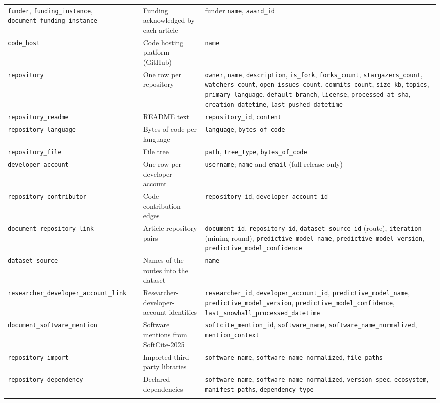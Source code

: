 \documentclass[pdflatex,sn-nature]{sn-jnl}%
\begin{document}
\begin{table}[p]
\begin{tabular}{@{}>{\raggedright\arraybackslash}p{94pt}>{\raggedright\arraybackslash}p{92pt}>{\raggedright\arraybackslash}p{170pt}@{}}
\texttt{funder}, \texttt{funding\_instance}, \texttt{document\_funding\_instance} & Funding acknowledged by each article & funder \texttt{name}, \texttt{award\_id} \\
\texttt{code\_host} & Code hosting platform (GitHub) & \texttt{name} \\
\texttt{repository} & One row per repository & \texttt{owner}, \texttt{name}, \texttt{description}, \texttt{is\_fork}, \texttt{forks\_count}, \texttt{stargazers\_count}, \texttt{watchers\_count}, \texttt{open\_issues\_count}, \texttt{commits\_count}, \texttt{size\_kb}, \texttt{topics}, \texttt{primary\_language}, \texttt{default\_branch}, \texttt{license}, \texttt{processed\_at\_sha}, \texttt{creation\_datetime}, \texttt{last\_pushed\_datetime} \\
\texttt{repository\_readme} & README text & \texttt{repository\_id}, \texttt{content} \\
\texttt{repository\_language} & Bytes of code per language & \texttt{language}, \texttt{bytes\_of\_code} \\
\texttt{repository\_file} & File tree & \texttt{path}, \texttt{tree\_type}, \texttt{bytes\_of\_code} \\
\texttt{developer\_account} & One row per developer account & \texttt{username}; \texttt{name} and \texttt{email} (full release only) \\
\texttt{repository\_contributor} & Code contribution edges & \texttt{repository\_id}, \texttt{developer\_account\_id} \\
\texttt{document\_repository\_link} & Article-repository pairs & \texttt{document\_id}, \texttt{repository\_id}, \texttt{dataset\_source\_id} (route), \texttt{iteration} (mining round), \texttt{predictive\_model\_name}, \texttt{predictive\_model\_version}, \texttt{predictive\_model\_confidence} \\
\texttt{dataset\_source} & Names of the routes into the dataset & \texttt{name} \\
\texttt{researcher\_developer\_\allowbreak account\_link} & Researcher-developer-account identities & \texttt{researcher\_id}, \texttt{developer\_account\_id}, \texttt{predictive\_model\_name}, \texttt{predictive\_model\_version}, \texttt{predictive\_model\_confidence}, \texttt{last\_snowball\_processed\_datetime} \\
\texttt{document\_software\_mention} & Software mentions from SoftCite-2025 & \texttt{softcite\_mention\_id}, \texttt{software\_name}, \texttt{software\_name\_normalized}, \texttt{mention\_context} \\
\texttt{repository\_import} & Imported third-party libraries & \texttt{software\_name}, \texttt{software\_name\_normalized}, \texttt{file\_paths} \\
\texttt{repository\_dependency} & Declared dependencies & \texttt{software\_name}, \texttt{software\_name\_normalized}, \texttt{version\_spec}, \texttt{ecosystem}, \texttt{manifest\_paths}, \texttt{dependency\_type} \\
\botrule
\end{tabular}
\end{table}
\end{document}
